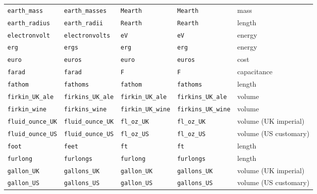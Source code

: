 \begin{landscape}
\begin{center}
\begin{longtable}{|lllll|}
{\tt\footnotesize earth\_mass} & {\tt\footnotesize earth\_masses} & {\tt\footnotesize Mearth} & {\tt\footnotesize Mearth} & mass \\
{\tt\footnotesize earth\_radius} & {\tt\footnotesize earth\_radii} & {\tt\footnotesize Rearth} & {\tt\footnotesize Rearth} & length \\
{\tt\footnotesize electronvolt} & {\tt\footnotesize electronvolts} & {\tt\footnotesize eV} & {\tt\footnotesize eV} & energy \\
{\tt\footnotesize erg} & {\tt\footnotesize ergs} & {\tt\footnotesize erg} & {\tt\footnotesize erg} & energy \\
{\tt\footnotesize euro} & {\tt\footnotesize euros} & {\tt\footnotesize euro} & {\tt\footnotesize euros} & cost \\
{\tt\footnotesize farad} & {\tt\footnotesize farad} & {\tt\footnotesize F} & {\tt\footnotesize F} & capacitance \\
{\tt\footnotesize fathom} & {\tt\footnotesize fathoms} & {\tt\footnotesize fathom} & {\tt\footnotesize fathoms} & length \\
{\tt\footnotesize firkin\_UK\_ale} & {\tt\footnotesize firkins\_UK\_ale} & {\tt\footnotesize firkin\_UK\_ale} & {\tt\footnotesize firkins\_UK\_ale} & volume \\
{\tt\footnotesize firkin\_wine} & {\tt\footnotesize firkins\_wine} & {\tt\footnotesize firkin\_UK\_wine} & {\tt\footnotesize firkins\_UK\_wine} & volume \\
{\tt\footnotesize fluid\_ounce\_UK} & {\tt\footnotesize fluid\_ounce\_UK} & {\tt\footnotesize fl\_oz\_UK} & {\tt\footnotesize fl\_oz\_UK} & volume (UK imperial) \\
{\tt\footnotesize fluid\_ounce\_US} & {\tt\footnotesize fluid\_ounce\_US} & {\tt\footnotesize fl\_oz\_US} & {\tt\footnotesize fl\_oz\_US} & volume (US customary) \\
{\tt\footnotesize foot} & {\tt\footnotesize feet} & {\tt\footnotesize ft} & {\tt\footnotesize ft} & length \\
{\tt\footnotesize furlong} & {\tt\footnotesize furlongs} & {\tt\footnotesize furlong} & {\tt\footnotesize furlongs} & length \\
{\tt\footnotesize gallon\_UK} & {\tt\footnotesize gallons\_UK} & {\tt\footnotesize gallon\_UK} & {\tt\footnotesize gallons\_UK} & volume (UK imperial) \\
{\tt\footnotesize gallon\_US} & {\tt\footnotesize gallons\_US} & {\tt\footnotesize gallon\_US} & {\tt\footnotesize gallons\_US} & volume (US customary) \\

\end{longtable}
\end{center}
\end{landscape}
